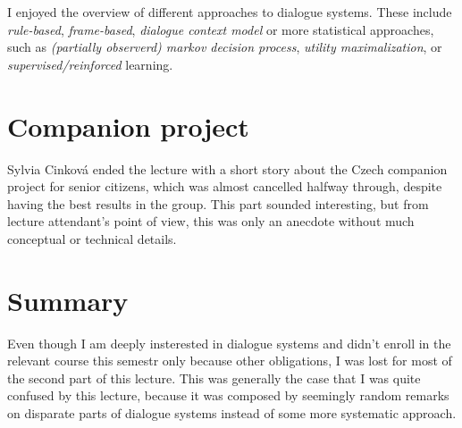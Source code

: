 \documentclass[a4paper]{article}
\begin{document}
I enjoyed the overview of different approaches to dialogue systems. These include \textit{rule-based}, \textit{frame-based}, \textit{dialogue context model} or more statistical approaches, such as \textit{(partially observerd) markov decision process}, \textit{utility maximalization}, or \textit{supervised/reinforced} learning.

\section*{Companion project}

Sylvia Cinková ended the lecture with a short story about the Czech companion project for senior citizens, which was almost cancelled halfway through, despite having the best results in the group. This part sounded interesting, but from lecture attendant's point of view, this was only an anecdote without much conceptual or technical details.

\section*{Summary}

Even though I am deeply insterested in dialogue systems and didn't enroll in the relevant course this semestr only because other obligations, I was lost for most of the second part of this lecture. This was generally the case that I was quite confused by this lecture, because it was composed by seemingly random remarks on disparate parts of dialogue systems instead of some more systematic approach.
\end{document}
